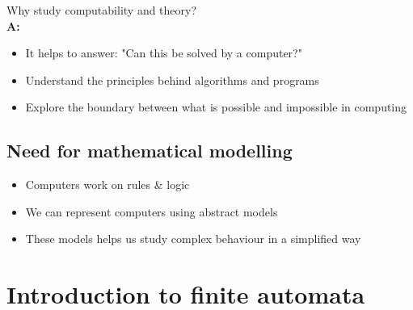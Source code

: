 \documentclass{article}
\newcommand{\answer}[1]{\\\textbf{A:} #1}
\begin{document}
\begin{qanda}
    \item Why study computability and theory?
    \answer{
        \begin{itemize}
            \item It helps to answer: "Can this be solved by a computer?"
            \item Understand the principles behind algorithms and programs
            \item Explore the boundary between what is possible and impossible in computing
        \end{itemize}
    }
\end{qanda}

\subsection{Need for mathematical modelling}
\begin{itemize}
    \item Computers work on rules \& logic
    \item We can represent computers using abstract models
    \item These models helps us study complex behaviour in a simplified way
\end{itemize}

\section{Introduction to finite automata}
\end{document}
